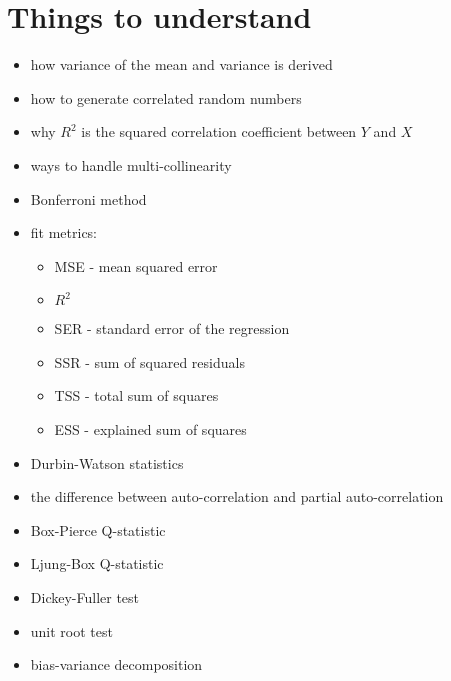 \chapter{Things to understand}

\begin{itemize}
	\item how variance of the mean and variance is derived
	\item how to generate correlated random numbers
	\item why $R^{2}$ is the squared correlation coefficient between $Y$ and $X$
	\item ways to handle multi-collinearity
	\item Bonferroni method
	\item fit metrics:
	\begin{itemize}
		\item MSE - mean squared error
		\item $R^{2}$
		\item SER - standard error of the regression
		\item SSR - sum of squared residuals
		\item TSS - total sum of squares
		\item ESS - explained sum of squares
	\end{itemize}
	\item Durbin-Watson statistics
	\item the difference between auto-correlation and partial auto-correlation
	\item Box-Pierce Q-statistic
	\item Ljung-Box Q-statistic
	\item Dickey-Fuller test
	\item unit root test
	\item bias-variance decomposition
\end{itemize}